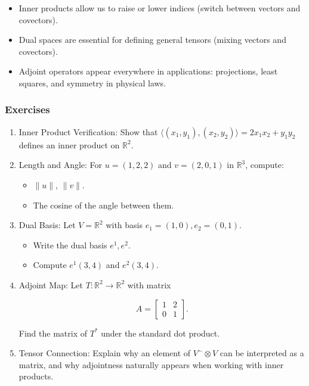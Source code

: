 \documentclass[
  letterpaper,
  DIV=11,
  numbers=noendperiod]{scrreprt}
\providecommand{\tightlist}{%
  \setlength{\itemsep}{0pt}\setlength{\parskip}{0pt}}
\begin{document}
\begin{itemize}
\tightlist
\item
  Inner products allow us to raise or lower indices (switch between
  vectors and covectors).
\item
  Dual spaces are essential for defining general tensors (mixing vectors
  and covectors).
\item
  Adjoint operators appear everywhere in applications: projections,
  least squares, and symmetry in physical laws.
\end{itemize}

\subsubsection{Exercises}\label{exercises-6}

\begin{enumerate}
\def\labelenumi{\arabic{enumi}.}
\item
  Inner Product Verification: Show that
  \(\langle (x_1,y_1),(x_2,y_2)\rangle = 2x_1x_2 + y_1y_2\) defines an
  inner product on \(\mathbb{R}^2\).
\item
  Length and Angle: For \(u=(1,2,2)\) and \(v=(2,0,1)\) in
  \(\mathbb{R}^3\), compute:

  \begin{itemize}
  \tightlist
  \item
    \(\|u\|\), \(\|v\|\).
  \item
    The cosine of the angle between them.
  \end{itemize}
\item
  Dual Basis: Let \(V=\mathbb{R}^2\) with basis
  \(e_1=(1,0), e_2=(0,1)\).

  \begin{itemize}
  \tightlist
  \item
    Write the dual basis \(e^1, e^2\).
  \item
    Compute \(e^1(3,4)\) and \(e^2(3,4)\).
  \end{itemize}
\item
  Adjoint Map: Let \(T:\mathbb{R}^2 \to \mathbb{R}^2\) with matrix

  \[
  A = \begin{bmatrix}1 & 2 \\ 0 & 1\end{bmatrix}.
  \]

  Find the matrix of \(T^*\) under the standard dot product.
\item
  Tensor Connection: Explain why an element of \(V^- \otimes V\) can be
  interpreted as a matrix, and why adjointness naturally appears when
  working with inner products.
\end{enumerate}
\end{document}
